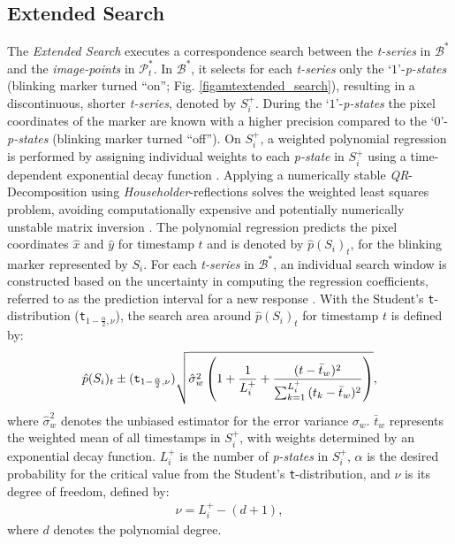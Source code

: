 \documentclass[lettersize,preprint]{elsarticle}
\newcommand{\BS}{$\mathcal{B}^*$}
\newcommand{\ps}{\emph{p-state}}
\newcommand{\ts}{\emph{t-series}}
\begin{document}
\subsection{Extended Search}\label{subsecamtextended_search}
The \emph{Extended Search} executes a correspondence search between the \ts{} in \BS{} and the \emph{image-points} in $\mathcal{P}_t^*$.
In \BS{}, it selects for each \ts{} only the \enquote*{$1$}-\emph{p-states} (blinking marker turned \enquote{on}; Fig. \ref{figamtextended_search}), resulting in a discontinuous, shorter \ts{}, denoted by $S_i^+$.
During the \enquote*{$1$}-\emph{p-states} the pixel coordinates of the marker are known with a higher precision compared to the \enquote*{$0$}-\emph{p-states} (blinking marker turned \enquote{off}).
On $S_i^+$, a weighted polynomial regression is performed by assigning individual weights to each \ps{} in $S_i^+$ using a time-dependent exponential decay function \cite{serwayModernPhysics2005}.
Applying a numerically stable \emph{QR}-Decomposition using \emph{Householder}-reflections \cite{golubMatrixComputations1996} solves the weighted least squares problem, avoiding computationally expensive and potentially numerically unstable matrix inversion \cite{ComputationalAlgorithmsFitting2003}.
The polynomial regression predicts the pixel coordinates $\hat{x}$ and $\hat{y}$ for timestamp $t$ and is denoted by $\hat{p}(S_i)_t$, for the blinking marker represented by $S_i$.
For each \ts{} in \BS{}, an individual search window is constructed based on the uncertainty in computing the regression coefficients, referred to as the prediction interval for a new response \cite{rossChapterRegression2014}.
With the Student's \texttt{t}-distribution (\texttt{t}$_{1-\frac{\alpha}{2},\nu}$), the search area around $\hat{p}{(S_i)_t}$ for timestamp $t$ is defined by:
\begin{align}
  \hat{p}(S_i)_t \pm (\text{\texttt{t}}_{1-\frac{\alpha}{2},\nu})\sqrt{\hat{\sigma}_w^2\left(1+\frac{1}{L_i^+}+\frac{(t-\bar{t}_w)^2}{\sum_{k=1}^{L_i^+}{(t_k-\bar{t}_w)^2}}\right)},\label{eqamtextended_search}
\end{align}
where $\hat{\sigma}_w^2$ denotes the unbiased estimator for the error variance $\sigma_w$. $\bar{t}_w$ represents the weighted mean of all timestamps in $S_i^+$, with weights determined by an exponential decay function.
$L_i^+$ is the number of \emph{p-states} in $S_{i}^+$, $\alpha$ is the desired probability for the critical value from the Student's \texttt{t}-distribution, and $\nu$ is its degree of freedom, defined by:
\begin{align}
  \nu = L_i^+ - (d + 1),
\end{align}
where $d$ denotes the polynomial degree.
\end{document}
